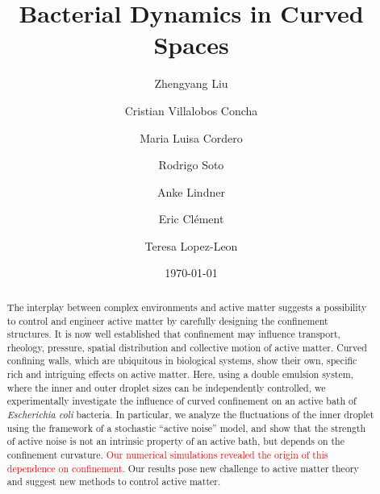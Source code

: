 \documentclass[%
superscriptaddress,
 amsmath,amssymb,
 aps,prl,
]{revtex4-2}
\begin{document}

\title{Bacterial Dynamics in Curved Spaces}%

\author{Zhengyang Liu}

%

\author{Cristian Villalobos Concha}
\author{Maria Luisa Cordero}
\author{Rodrigo Soto}

\author{Anke Lindner}
\author{Eric Clément}
%


\author{Teresa Lopez-Leon}

\date{\today}%

\begin{abstract}
The interplay between complex environments and active matter suggests a possibility to control and engineer active matter by carefully designing the confinement structures. It is now well established that confinement may influence transport, rheology, pressure, spatial distribution and collective motion of active matter. Curved confining walls, which are ubiquitous in biological systems, show their own, specific rich and intriguing effects on active matter. Here, using a double emulsion system, where the inner and outer droplet sizes can be independently controlled, we experimentally investigate the influence of curved confinement on an active bath of \textit{Escherichia coli} bacteria. In particular, we analyze the fluctuations of the inner droplet using the framework of a stochastic ``active noise'' model, and show that the strength of active noise is not an intrinsic property of an active bath, but depends on the confinement curvature. \textcolor{red}{Our numerical simulations revealed the origin of this dependence on confinement.} Our results pose new challenge to active matter theory and suggest new methods to control active matter.

\end{abstract}
\end{document}
